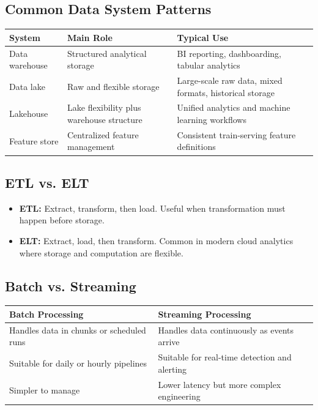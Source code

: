 \documentclass[11pt,a4paper]{article}
\begin{document}
\subsection{Common Data System Patterns}

\begin{longtable}{@{}p{3.0cm}p{3.6cm}p{6.4cm}@{}}
\toprule
\rowcolor{primary!15}
\textbf{System} & \textbf{Main Role} & \textbf{Typical Use} \\
\midrule
\endhead
Data warehouse & Structured analytical storage & BI reporting, dashboarding, tabular analytics \\
\addlinespace
Data lake & Raw and flexible storage & Large-scale raw data, mixed formats, historical storage \\
\addlinespace
Lakehouse & Lake flexibility plus warehouse structure & Unified analytics and machine learning workflows \\
\addlinespace
Feature store & Centralized feature management & Consistent train-serving feature definitions \\
\bottomrule
\end{longtable}

\subsection{ETL vs. ELT}

\begin{itemize}[leftmargin=*]
  \item \textbf{ETL:} Extract, transform, then load. Useful when transformation must happen before storage.
  \item \textbf{ELT:} Extract, load, then transform. Common in modern cloud analytics where storage and computation are flexible.
\end{itemize}

\subsection{Batch vs. Streaming}

\begin{center}
\begin{tabular}{@{}p{6.2cm}p{6.2cm}@{}}
\toprule
\textbf{Batch Processing} & \textbf{Streaming Processing} \\
\midrule
Handles data in chunks or scheduled runs & Handles data continuously as events arrive \\
Suitable for daily or hourly pipelines & Suitable for real-time detection and alerting \\
Simpler to manage & Lower latency but more complex engineering \\
\bottomrule
\end{tabular}
\end{center}
\end{document}
